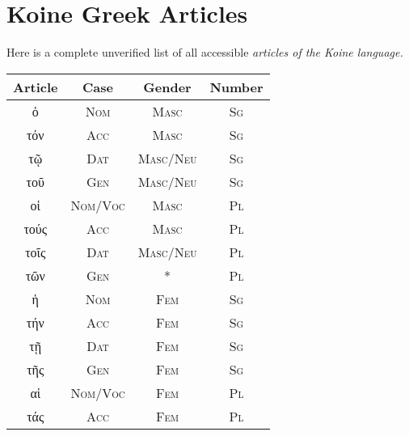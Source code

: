 \documentclass[10pt]{memoir}
\newcommand{\tsc}[1]{\textsc{#1}}
\newcommand{\grc}[1]{\fontspec{Inter}#1}
\begin{document}
    \section*{Koine Greek Articles}
    Here is a complete unverified list of all accessible \em articles \normal of the Koine language.

    \begin{table}[H]
        \begin{tabular}{c|ccc}
            \textbf{Article} & \textbf{Case} & \textbf{Gender} & \textbf{Number} \\
            \hline
            \grc{ὁ}                & \tsc{Nom}           & \tsc{Masc}            & \tsc{Sg}              \\
            \grc{τόν}              & \tsc{Acc}           & \tsc{Masc}            & \tsc{Sg}              \\
            \grc{τῷ}               & \tsc{Dat}           & \tsc{Masc}/\tsc{Neu}        & \tsc{Sg}              \\
            \grc{τοῦ}              & \tsc{Gen}           & \tsc{Masc}/\tsc{Neu}        & \tsc{Sg}              \\
            \grc{οἱ}               & \tsc{Nom}/\tsc{Voc}       & \tsc{Masc}            & \tsc{Pl}              \\
            \grc{τούς}             & \tsc{Acc}           & \tsc{Masc}            & \tsc{Pl}              \\
            \grc{τοῖς}             & \tsc{Dat}           & \tsc{Masc}/\tsc{Neu}        & \tsc{Pl}              \\
            \grc{τῶν}              & \tsc{Gen}           & *             & \tsc{Pl}              \\
            \grc{ἡ}                & \tsc{Nom}           & \tsc{Fem}             & \tsc{Sg}              \\
            \grc{τήν}              & \tsc{Acc}           & \tsc{Fem}             & \tsc{Sg}              \\
            \grc{τῇ}               & \tsc{Dat}           & \tsc{Fem}             & \tsc{Sg}              \\
            \grc{τῆς}              & \tsc{Gen}           & \tsc{Fem}             & \tsc{Sg}              \\
            \grc{αἱ}               & \tsc{Nom}/\tsc{Voc}       & \tsc{Fem}             & \tsc{Pl}              \\
            \grc{τάς}              & \tsc{Acc}           & \tsc{Fem}             & \tsc{Pl}              \\

\end{tabular}
\end{table}
\end{document}
